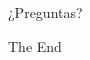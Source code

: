 \documentclass[10pt,handout]{beamer}
\begin{document}
\begin{frame}
\Huge{\centerline{¿Preguntas?}}
\end{frame}

\begin{frame}
\Huge{\centerline{The End}}
\end{frame}
\end{document}
